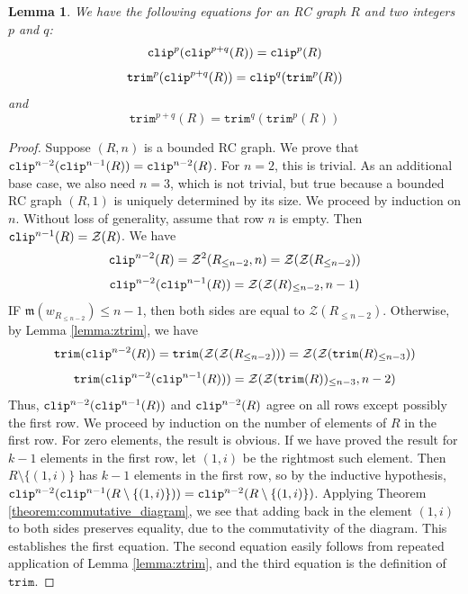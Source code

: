 \documentclass{amsart}
\newtheorem{lemma}{Lemma}[subsection]
\theoremstyle{definition}
\theoremstyle{remark}
\numberwithin{equation}{subsection}
\newcommand{\wof}[1]{w_{#1}}
\newcommand{\trm}{\mathtt{trim}}
\newcommand{\zeromap}{\mathcal{Z}}
\newcommand{\maxd}{\mathfrak{m}}
\begin{document}
\begin{lemma} \label{lemma:assoc_clip}
  We have the following equations for an RC graph $R$ and two integers $p$ and $q$:
$$\mathtt{clip}^p(\mathtt{clip}^{p+q}(R)) = \mathtt{clip}^p(R)$$
$$\trm^p(\clp^{p+q}(R)) = \clp^q(\trm^p(R))$$ 
and 
$$\trm^{p+q}(R) = \trm^q(\trm^{p}(R))$$
\end{lemma}
\begin{proof}
Suppose $(R, n)$ is a bounded RC graph. We prove that $\mathtt{clip}^{n-2}(\mathtt{clip}^{n-1}(R)) = \mathtt{clip}^{n-2}(R)$. For $n=2$, this is trivial. As an additional base case, we also need $n=3$, which is not trivial, but true because a bounded RC graph $(R,1)$ is uniquely determined by its size. We proceed by induction on $n$. Without loss of generality, assume that row $n$ is empty. Then $\clp^{n-1}(R) = \zeromap(R)$. We have
$$\clp^{n-2}(R) = \zeromap^2(R_{\leq n-2}, n)=\zeromap(\zeromap(R_{\leq n-2}))$$
$$\clp^{n-2}(\clp^{n-1}(R)) = \zeromap(\zeromap(R)_{\leq n-2}, n-1)$$
IF $\maxd(\wof{R_{\leq n-2}})\leq n-1$, then both sides are equal to $\zeromap(R_{\leq n-2})$. Otherwise, by Lemma \ref{lemma:ztrim}, we have
$$\trm(\clp^{n-2}(R)) = \trm(\zeromap(\zeromap(R_{\leq n-2}))) =\zeromap(\zeromap(\trm(R)_{\leq n-3}))$$
$$\trm(\clp^{n-2}(\clp^{n-1}(R))) = \zeromap(\zeromap(\trm(R))_{\leq n-3}, n-2)$$
Thus, $\mathtt{clip}^{n-2}(\mathtt{clip}^{n-1}(R))$ and $\mathtt{clip}^{n-2}(R)$ agree on all rows except possibly the first row. We proceed by induction on the number of elements of $R$ in the first row. For zero elements, the result is obvious. If we have proved the result for $k-1$ elements in the first row, let $(1, i)$ be the rightmost such element. Then $R\setminus\{(1,i)\}$ has $k-1$ elements in the first row, so by the inductive hypothesis, $\mathtt{clip}^{n-2}(\mathtt{clip}^{n-1}(R\setminus\{(1,i)\})) = \mathtt{clip}^{n-2}(R\setminus\{(1,i)\})$. Applying Theorem \ref{theorem:commutative_diagram}, we see that adding back in the element $(1,i)$ to both sides preserves equality, due to the commutativity of the diagram. This establishes the first equation. The second equation easily follows from repeated application of Lemma \ref{lemma:ztrim}, and the third equation is the definition of $\trm$.
\end{proof}
\end{document}
